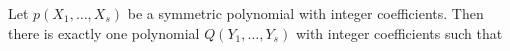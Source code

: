 Let $p(X_1, \ldots, X_s)$ be a symmetric polynomial with integer coefficients. Then there is exactly one polynomial $Q(Y_1, \ldots, Y_s)$ with integer coefficients such that

